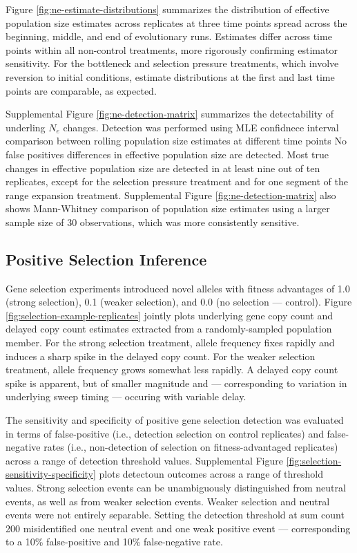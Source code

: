 

Figure \ref{fig:ne-estimate-distributions} summarizes the distribution of effective population size estimates across replicates at three time points spread across the beginning, middle, and end of evolutionary runs.
Estimates differ across time points within all non-control treatments, more rigorously confirming estimator sensitivity.
For the bottleneck and selection pressure treatments, which involve reversion to initial conditions, estimate distributions at the first and last time points are comparable, as expected.

Supplemental Figure \ref{fig:ne-detection-matrix} summarizes the detectability of underling $N_e$ changes.
Detection was performed using MLE confidnece interval comparison between rolling population size estimates at different time points
No false positives differences in effective population size are detected.
Most true changes in effective population size are detected in at least nine out of ten replicates, except for the selection pressure treatment and for one segment of the range expansion treatment.
Supplemental Figure \ref{fig:ne-detection-matrix} also shows Mann-Whitney comparison of population size estimates using a larger sample size of 30 observations, which was more consistently sensitive.

\subsection{Positive Selection Inference}

Gene selection experiments introduced novel alleles with fitness advantages of 1.0 (strong selection), 0.1 (weaker selection), and 0.0 (no selection --- control).
Figure \ref{fig:selection-example-replicates} jointly plots underlying gene copy count and delayed copy count estimates extracted from a randomly-sampled population member.
For the strong selection treatment, allele frequency fixes rapidly and induces a sharp spike in the delayed copy count.
For the weaker selection treatment, allele frequency grows somewhat less rapidly.
A delayed copy count spike is apparent, but of smaller magnitude and --- corresponding to variation in underlying sweep timing --- occuring with variable delay.

The sensitivity and specificity of positive gene selection detection was evaluated in terms of false-positive (i.e., detection selection on control replicates) and false-negative rates (i.e., non-detection of selection on fitness-advantaged replicates) across a range of detection threshold values.
Supplemental Figure \ref{fig:selection-sensitivity-specificity} plots detectoun outcomes across a range of threshold values.
Strong selection events can be unambiguously distinguished from neutral events, as well as from weaker selection events.
Weaker selection and neutral events were not entirely separable.
Setting the detection threshold at sum count 200 misidentified one neutral event and one weak positive event --- corresponding to a 10\% false-positive and 10\% false-negative rate.
